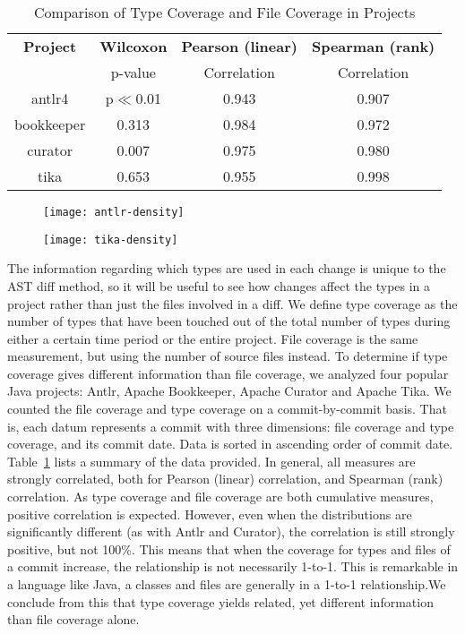 \begin{table}[!t]
\renewcommand{\arraystretch}{1.3}
\caption{Comparison of Type Coverage and File Coverage in Projects}
\label{tab:summary}
\centering
\begin{tabular}{c|ccc}
\hline
\bfseries Project & \bfseries Wilcoxon& \bfseries Pearson (linear) & \bfseries Spearman (rank) \\
& p-value & Correlation & Correlation \\
\hline
antlr4 & p$\ll$0.01 & 0.943 & 0.907\\
bookkeeper & 0.313 & 0.984 & 0.972\\
curator & 0.007 & 0.975 & 0.980\\
tika & 0.653 & 0.955 & 0.998\\
\hline
\end{tabular}
\end{table}

\begin{figure}[!h]
\centering
\texttt{[image: antlr-density]}
\caption{}
\end{figure}

\begin{figure}[!h]
\centering
\texttt{[image: tika-density]}
\caption{}
\end{figure}

The information regarding which types are used in each change is unique to the AST diff method, so it will be useful to see how changes affect the types in a project rather than just the files involved in a diff. We define type coverage as the number of types that have been touched out of the total number of types during either a certain time period or the entire project. File coverage is the same measurement, but using the number of source files instead. To determine if type coverage gives different information than file coverage, we analyzed four popular Java projects: Antlr, Apache Bookkeeper, Apache Curator and Apache Tika. We counted the file coverage and type coverage on a commit-by-commit basis. That is, each datum represents a commit with three dimensions: file coverage and type coverage, and its commit date. Data is sorted in ascending order of commit date. Table~\ref{tab:summary} lists a summary of the data provided. In general, all measures are strongly correlated, both for Pearson (linear) correlation, and Spearman (rank) correlation. As type coverage and file coverage are both cumulative measures, positive correlation is expected. However, even when the distributions are significantly different (as with Antlr and Curator), the correlation is still strongly positive, but not 100\%. This means that when the coverage for types and files of a commit increase, the relationship is not necessarily 1-to-1. This is remarkable in a language like Java, a classes and files are generally in a 1-to-1 relationship.We conclude from this that type coverage yields related, yet different information than file coverage alone.

